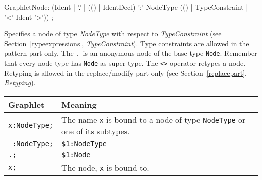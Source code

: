 \begin{rail}
GraphletNode: (Ident | 
    '.' |
    (() | IdentDecl) ':' NodeType (() | TypeConstraint | '<' Ident '>')) ;   
\end{rail}
Specifies a node of type \emph{NodeType} with respect to \emph{TypeConstraint} (see Section~\ref{typeexpressions}, \emph{TypeConstraint}). 
Type constraints are allowed in the pattern part only. 
The \texttt{.}\ is an anonymous node of the base type \texttt{Node}. 
Remember that every node type has \texttt{Node} as super type. The \texttt{<>} operator retypes a node. Retyping is allowed in the replace/modify part only (see Section~\ref{replacepart}, \emph{Retyping}).
\begin{center}
  \begin{tabularx}{\linewidth}{lX}
    \textbf{Graphlet} & \textbf{Meaning}\\ \hline
    \texttt{x:NodeType;} & The name \texttt{x} is bound to a node of type \texttt{NodeType} or one of its subtypes. \\
    \texttt{ :NodeType;} & \texttt{\$1:NodeType} \\
    \texttt{.;} & \texttt{\$1:Node} \\
    \texttt{x;} & The node, \texttt{x} is bound to.
  \end{tabularx}
\end{center} 

